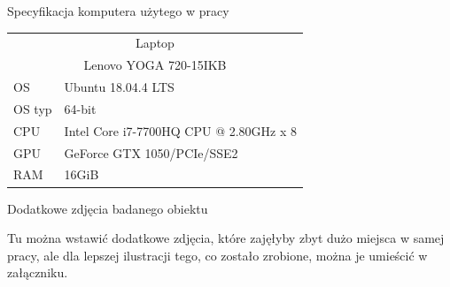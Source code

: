 \begin{easyappendix}{Specyfikacja komputera użytego w pracy}


\begin{tabular}{ |p{2cm}||p{10cm}|  }
 \hline
 \multicolumn{2}{|c|}{Laptop} \\
 \multicolumn{2}{|c|}{Lenovo YOGA 720-15IKB} \\
 \hline
 OS & Ubuntu 18.04.4 LTS\\
 OS typ & 64-bit\\
 CPU & Intel Core i7-7700HQ CPU @ 2.80GHz x 8\\
 GPU & GeForce GTX 1050/PCIe/SSE2\\
 RAM & 16GiB\\
 \hline
\end{tabular}


\end{easyappendix}

\begin{easyappendix}{Dodatkowe zdjęcia badanego obiektu}

Tu można wstawić dodatkowe zdjęcia, które zajęłyby zbyt dużo miejsca w samej pracy, ale dla lepszej ilustracji tego, co zostało zrobione, można je umieścić w załączniku.


\end{easyappendix}

